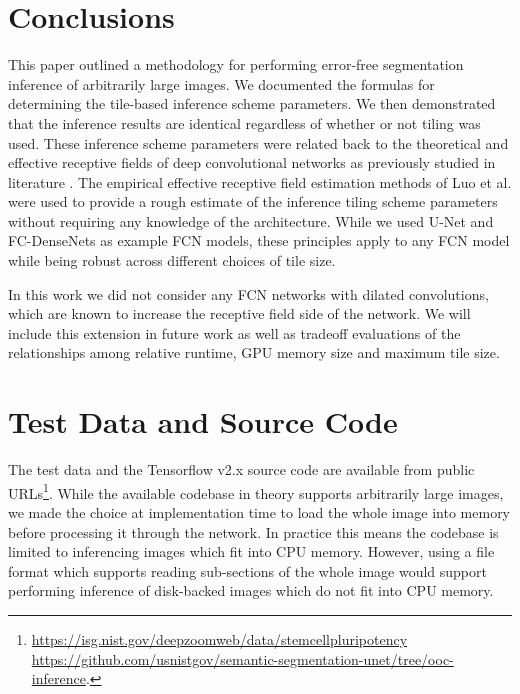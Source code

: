 \documentclass[10pt, indentfirst]{article}
\begin{document}
\section{Conclusions}
\label{conclusion}

This paper outlined a methodology for performing error-free segmentation inference of arbitrarily large images. 
We documented the formulas for determining the tile-based inference scheme parameters. We then demonstrated that the inference results are identical regardless of whether or not tiling was used. These inference scheme parameters were related back to the theoretical and effective receptive fields of deep convolutional networks as previously studied in literature \citep{Luo2016}. The empirical effective receptive field estimation methods of Luo et al. \citep{Luo2016} were used to provide a rough estimate of the inference tiling scheme parameters without requiring any knowledge of the architecture.
While we used U-Net and FC-DenseNets as example FCN models, these principles apply to any FCN model while being robust across different choices of tile size. 

In this work we did not consider any FCN networks with dilated convolutions, which are known to increase the receptive field side of the network. We will include this extension in future work as well as tradeoff evaluations of the relationships among relative runtime, GPU memory size and maximum tile size.




\section{Test Data and Source Code}
The test data and the Tensorflow v2.x source code are available from public URLs\footnote{
	\url{https://isg.nist.gov/deepzoomweb/data/stemcellpluripotency} \\
	\url{https://github.com/usnistgov/semantic-segmentation-unet/tree/ooc-inference}.}.
While the available codebase in theory supports arbitrarily large images, we made the choice at implementation time to load the whole image into memory before processing it through the network. In practice this means the codebase is limited to inferencing images which fit into CPU memory. However, using a file format which supports reading sub-sections of the whole image would support performing inference of disk-backed images which do not fit into CPU memory. 
\end{document}
